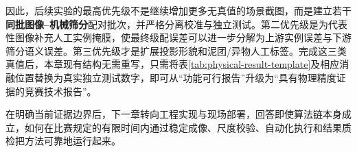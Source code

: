 因此，后续实验的最高优先级不是继续增加更多无真值的场景截图，而是建立若干\textbf{同批图像--机械筛分}配对批次，并严格分离校准与独立测试。第二优先级是为代表性图像补充人工实例掩膜，使最终级配误差可以进一步分解为上游实例误差与下游筛分语义误差。第三优先级才是扩展投影形貌和泥团/异物人工标签。完成这三类真值后，本章现有结构无需重写，只需将表\ref{tab:physical-result-template}及相应消融位置替换为真实独立测试数字，即可从“功能可行报告”升级为“具有物理精度证据的竞赛技术报告”。

在明确当前证据边界后，下一章转向工程实现与现场部署，回答即使算法链本身成立，如何在比赛规定的有限时间内通过稳定成像、尺度校验、自动化执行和结果质检把方法可靠地运行起来。
